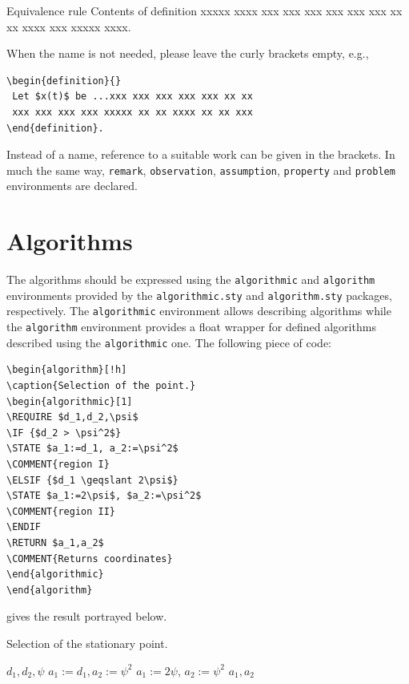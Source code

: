 \documentclass{amcs}
\begin{document}
\medskip
\begin{definition}{Equivalence rule}
 Contents of definition xxxxx xxxx xxx xxx
 xxx xxx xxx xxx xx xx xxxx xxx xxxxx xxxx.
 \label{definition1}
\end{definition}

\medskip\noindent
When the name is not needed, please leave the curly brackets empty, e.g.,

{\small \begin{verbatim}
\begin{definition}{}
 Let $x(t)$ be ...xxx xxx xxx xxx xxx xx xx
 xxx xxx xxx xxx xxxxx xx xx xxxx xx xx xxx
\end{definition}.
\end{verbatim}}

\noindent Instead of a name, reference to a suitable work can be given in the brackets. In much the same way, \verb+remark+, \verb+observation+, \verb+assumption+, \verb+property+ and \verb+problem+ environments are declared.

\section{Algorithms}
The algorithms should be expressed using the \verb+algorithmic+ and \verb+algorithm+ environments provided by the \verb+algorithmic.sty+ and \verb+algorithm.sty+ packages, respectively. The \verb+algorithmic+ environment allows describing algorithms while the \verb+algorithm+ environment provides a float wrapper for defined algorithms described using the \verb+algorithmic+ one. The following piece of code:
\begin{verbatim}
\begin{algorithm}[!h]
\caption{Selection of the point.}
\begin{algorithmic}[1]
\REQUIRE $d_1,d_2,\psi$
\IF {$d_2 > \psi^2$}
\STATE $a_1:=d_1, a_2:=\psi^2$
\COMMENT{region I}
\ELSIF {$d_1 \geqslant 2\psi$}
\STATE $a_1:=2\psi$, $a_2:=\psi^2$
\COMMENT{region II}
\ENDIF
\RETURN $a_1,a_2$
\COMMENT{Returns coordinates}
\end{algorithmic}
\end{algorithm}
\end{verbatim}
gives the result portrayed below.
\begin{algorithm}[!h]
\caption{Selection of the stationary point.}
\label{a:alg}
\begin{algorithmic}[1]
\REQUIRE $d_1,d_2,\psi$
\STATE $a_1:=d_1, a_2:=\psi^2$
\STATE $a_1:=2\psi$, $a_2:=\psi^2$
\ENDIF
\RETURN $a_1,a_2$
\end{algorithmic}
\end{algorithm}
\end{document}
